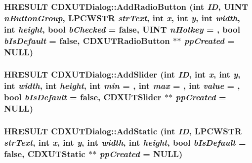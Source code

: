 \label{class_c_d_x_u_t_dialog_a10004abccfeb7cad590614ff5b2cde65}
\hypertarget{class_c_d_x_u_t_dialog_a855c97f014a3a6c63706cf300527a817}{
\subsubsection[{AddRadioButton}]{\setlength{\rightskip}{0pt plus 5cm}HRESULT CDXUTDialog::AddRadioButton ({\bf int} {\em ID}, \/  UINT {\em nButtonGroup}, \/  LPCWSTR {\em strText}, \/  {\bf int} {\em x}, \/  {\bf int} {\em y}, \/  {\bf int} {\em width}, \/  {\bf int} {\em height}, \/  bool {\em bChecked} = {\ttfamily false}, \/  UINT {\em nHotkey} = {}, \/  bool {\em bIsDefault} = {\ttfamily false}, \/  {\bf CDXUTRadioButton} $\ast$$\ast$ {\em ppCreated} = {\ttfamily NULL})}}
\label{class_c_d_x_u_t_dialog_a855c97f014a3a6c63706cf300527a817}
\hypertarget{class_c_d_x_u_t_dialog_aaaaade0b42673d6b6a5a244fe4ae25ee}{
\subsubsection[{AddSlider}]{\setlength{\rightskip}{0pt plus 5cm}HRESULT CDXUTDialog::AddSlider ({\bf int} {\em ID}, \/  {\bf int} {\em x}, \/  {\bf int} {\em y}, \/  {\bf int} {\em width}, \/  {\bf int} {\em height}, \/  {\bf int} {\em min} = {}, \/  {\bf int} {\em max} = {}, \/  {\bf int} {\em value} = {}, \/  bool {\em bIsDefault} = {\ttfamily false}, \/  {\bf CDXUTSlider} $\ast$$\ast$ {\em ppCreated} = {\ttfamily NULL})}}
\label{class_c_d_x_u_t_dialog_aaaaade0b42673d6b6a5a244fe4ae25ee}
\hypertarget{class_c_d_x_u_t_dialog_afe893ab17f6905d1908e6fd1499749b1}{
\subsubsection[{AddStatic}]{\setlength{\rightskip}{0pt plus 5cm}HRESULT CDXUTDialog::AddStatic ({\bf int} {\em ID}, \/  LPCWSTR {\em strText}, \/  {\bf int} {\em x}, \/  {\bf int} {\em y}, \/  {\bf int} {\em width}, \/  {\bf int} {\em height}, \/  bool {\em bIsDefault} = {\ttfamily false}, \/  {\bf CDXUTStatic} $\ast$$\ast$ {\em ppCreated} = {\ttfamily NULL})}}
\label{class_c_d_x_u_t_dialog_afe893ab17f6905d1908e6fd1499749b1}
